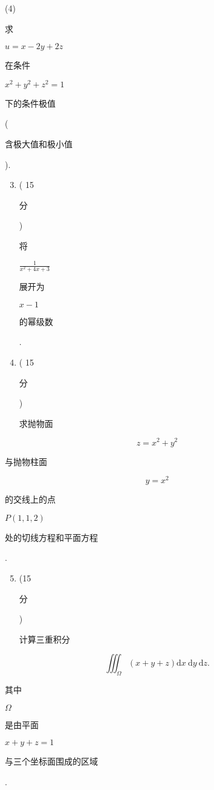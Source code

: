 \documentclass[10pt]{article}
\begin{document}
(4) \begin{CJK}{UTF8}{mj}求\end{CJK} $u=x-2 y+2 z$ \begin{CJK}{UTF8}{mj}在条件\end{CJK} $x^{2}+y^{2}+z^{2}=1$ \begin{CJK}{UTF8}{mj}下的条件极值\end{CJK} (\begin{CJK}{UTF8}{mj}含极大值和极小值\end{CJK}).

\begin{enumerate}
  \setcounter{enumi}{2}
  \item ( 15 \begin{CJK}{UTF8}{mj}分\end{CJK}) \begin{CJK}{UTF8}{mj}将\end{CJK} $\frac{1}{x^{2}+4 x+3}$ \begin{CJK}{UTF8}{mj}展开为\end{CJK} $x-1$ \begin{CJK}{UTF8}{mj}的幂级数\end{CJK}.

  \item ( 15 \begin{CJK}{UTF8}{mj}分\end{CJK}) \begin{CJK}{UTF8}{mj}求抛物面\end{CJK}

\end{enumerate}
$$
z=x^{2}+y^{2}
$$
\begin{CJK}{UTF8}{mj}与抛物柱面\end{CJK}
$$
y=x^{2}
$$
\begin{CJK}{UTF8}{mj}的交线上的点\end{CJK} $P(1,1,2)$ \begin{CJK}{UTF8}{mj}处的切线方程和平面方程\end{CJK}.

\begin{enumerate}
  \setcounter{enumi}{4}
  \item (15 \begin{CJK}{UTF8}{mj}分\end{CJK}) \begin{CJK}{UTF8}{mj}计算三重积分\end{CJK}
\end{enumerate}
$$
\iiint_{\Omega}(x+y+z) \mathrm{d} x \mathrm{~d} y \mathrm{~d} z .
$$
\begin{CJK}{UTF8}{mj}其中\end{CJK} $\Omega$ \begin{CJK}{UTF8}{mj}是由平面\end{CJK} $x+y+z=1$ \begin{CJK}{UTF8}{mj}与三个坐标面围成的区域\end{CJK}.
\end{document}
